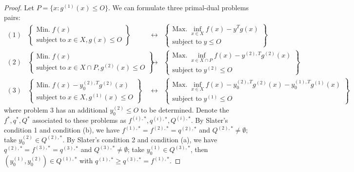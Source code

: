 \begin{proof}
	Let $P=\{x:g^{(1)}(x)\leq O\}$. We can formulate three primal-dual problems pairs:
	\[
		\begin{matrix}
			(1)                                    &
			\begin{Bmatrix}
				\text{Min.}\;    f(x) \\
				\text{subject to}\;  x\in X,g(x)\leq O
			\end{Bmatrix} & \leftrightarrow                                    &
			\begin{Bmatrix}
				\text{Max.}\;    \inf_{x\in X}f(x)-y^Tg(x) \\
				\text{subject to}\;    y\leq O
			\end{Bmatrix}
			\\
			(2)                                    & \begin{Bmatrix}
				                                         \text{Min.}\;    f(x) \\
				                                         \text{subject to}\;  x\in X\cap P,g^{(2)}(x)\leq O
			                                         \end{Bmatrix} & \leftrightarrow &
			\begin{Bmatrix}
				\text{Max.}\;    \inf_{x\in X\cap P}f(x)-y^{(2),T}g^{(2)}(x) \\
				\text{subject to}\;    y^{(2)}\leq O
			\end{Bmatrix}                               \\
			(3)                                    & \begin{Bmatrix}
				                                         \text{Min.}\;    f(x)-y^{(2),T}_0g^{(2)}(x) \\
				                                         \text{subject to}\;  x\in X,g^{(1)}(x)\leq O
			                                         \end{Bmatrix}     & \leftrightarrow &
			\begin{Bmatrix}
				\text{Max.}\;    \inf_{x\in X}f(x)-y^{(2),T}_0g^{(2)}(x)-y^{(1),T}_0g^{(1)}(x) \\
				\text{subject to}\;    y^{(1)}\leq O
			\end{Bmatrix}
		\end{matrix}
	\]
	where problem 3 has an additional $y^{(2)}_0\leq O$ to be determined. Denote the $f^\ast,q^\ast,Q^\ast$ associated to these problems as $f^{(i),\ast},q^{(i),\ast},Q^{(i),\ast}$. By Slater's condition 1 and condition (b), we have $f^{(1),\ast}=f^{(2),\ast}=q^{(2),\ast}$ and $Q^{(2),\ast}\neq\emptyset$; take $y^{(2)}_0\in Q^{(2),\ast}$. By Slater's condition 2 and condition (a), we have $q^{(2),\ast}=f^{(3),\ast}=q^{(3),\ast}$ and $Q^{(3),\ast}\neq\emptyset$; take $y^{(1)}_0\in Q^{(3),\ast}$, then $(y^{(1)}_0,y^{(2)}_0)\in Q^{(1),\ast}$ with $q^{(1),\ast}\geq q^{(3),\ast}=f^{(1),\ast}$.
\end{proof}

